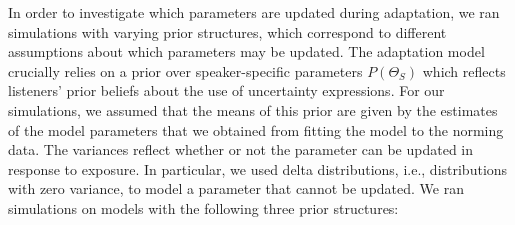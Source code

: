 \documentclass[man, floatsintext]{apa6}
\begin{document}
In order to investigate which parameters are updated during adaptation, we ran simulations
with varying prior structures, which correspond to different assumptions about which parameters may be updated.
The adaptation model crucially relies on a prior over speaker-specific parameters $P(\Theta_S)$
which reflects listeners' prior beliefs about the use of uncertainty expressions. For our simulations,
we assumed that the means of this prior are given by the estimates of the model parameters that 
we obtained from fitting the model to the norming data. The variances reflect whether or not the parameter can be updated in response to exposure. In particular, we used delta distributions, i.e., distributions with zero variance, to model a parameter that cannot be updated. We ran simulations on models with the following three prior structures:
\end{document}
